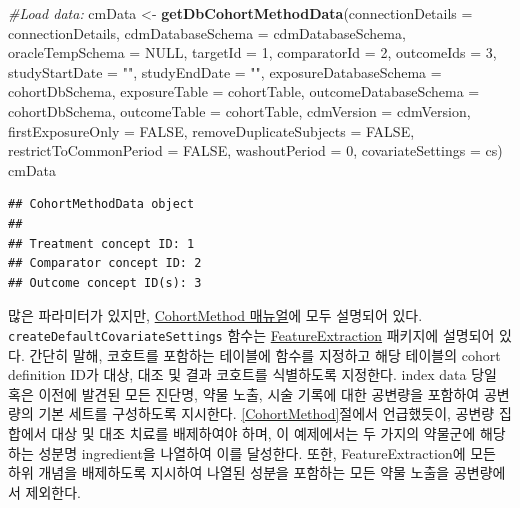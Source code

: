 \documentclass[11pt]{book}
\newenvironment{Shaded}{\begin{snugshade}}{\end{snugshade}}
\newcommand{\KeywordTok}[1]{\textcolor[rgb]{0.13,0.29,0.53}{\textbf{#1}}}
\newcommand{\DataTypeTok}[1]{\textcolor[rgb]{0.13,0.29,0.53}{#1}}
\newcommand{\DecValTok}[1]{\textcolor[rgb]{0.00,0.00,0.81}{#1}}
\newcommand{\StringTok}[1]{\textcolor[rgb]{0.31,0.60,0.02}{#1}}
\newcommand{\CommentTok}[1]{\textcolor[rgb]{0.56,0.35,0.01}{\textit{#1}}}
\newcommand{\OtherTok}[1]{\textcolor[rgb]{0.56,0.35,0.01}{#1}}
\newcommand{\NormalTok}[1]{#1}
\theoremstyle{definition}
\theoremstyle{definition}
\theoremstyle{definition}
\theoremstyle{remark}
\begin{document}
\begin{Shaded}
\begin{Highlighting}[]
\CommentTok{#Load data:}
\NormalTok{cmData <-}\StringTok{ }\KeywordTok{getDbCohortMethodData}\NormalTok{(}\DataTypeTok{connectionDetails =}\NormalTok{ connectionDetails,}
                                \DataTypeTok{cdmDatabaseSchema =}\NormalTok{ cdmDatabaseSchema,}
                                \DataTypeTok{oracleTempSchema =} \OtherTok{NULL}\NormalTok{,}
                                \DataTypeTok{targetId =} \DecValTok{1}\NormalTok{,}
                                \DataTypeTok{comparatorId =} \DecValTok{2}\NormalTok{,}
                                \DataTypeTok{outcomeIds =} \DecValTok{3}\NormalTok{,}
                                \DataTypeTok{studyStartDate =} \StringTok{""}\NormalTok{,}
                                \DataTypeTok{studyEndDate =} \StringTok{""}\NormalTok{,}
                                \DataTypeTok{exposureDatabaseSchema =}\NormalTok{ cohortDbSchema,}
                                \DataTypeTok{exposureTable =}\NormalTok{ cohortTable,}
                                \DataTypeTok{outcomeDatabaseSchema =}\NormalTok{ cohortDbSchema,}
                                \DataTypeTok{outcomeTable =}\NormalTok{ cohortTable,}
                                \DataTypeTok{cdmVersion =}\NormalTok{ cdmVersion,}
                                \DataTypeTok{firstExposureOnly =} \OtherTok{FALSE}\NormalTok{,}
                                \DataTypeTok{removeDuplicateSubjects =} \OtherTok{FALSE}\NormalTok{,}
                                \DataTypeTok{restrictToCommonPeriod =} \OtherTok{FALSE}\NormalTok{,}
                                \DataTypeTok{washoutPeriod =} \DecValTok{0}\NormalTok{,}
                                \DataTypeTok{covariateSettings =}\NormalTok{ cs)}
\NormalTok{cmData}
\end{Highlighting}
\end{Shaded}

\begin{verbatim}
## CohortMethodData object
## 
## Treatment concept ID: 1
## Comparator concept ID: 2
## Outcome concept ID(s): 3
\end{verbatim}

많은 파라미터가 있지만,
\href{https://ohdsi.github.io/CohortMethod/reference/}{CohortMethod
매뉴얼}에 모두 설명되어 있다. \texttt{createDefaultCovariateSettings}
함수는
\href{https://ohdsi.github.io/FeatureExtraction/}{FeatureExtraction}
패키지에 설명되어 있다. 간단히 말해, 코호트를 포함하는 테이블에 함수를
지정하고 해당 테이블의 cohort definition ID가 대상, 대조 및 결과
코호트를 식별하도록 지정한다. index data 당일 혹은 이전에 발견된 모든
진단명, 약물 노출, 시술 기록에 대한 공변량을 포함하여 공변량의 기본
세트를 구성하도록 지시한다. \ref{CohortMethod}절에서 언급했듯이, 공변량
집합에서 대상 및 대조 치료를 배제하여야 하며, 이 예제에서는 두 가지의
약물군에 해당하는 성분명 ingredient을 나열하여 이를 달성한다. 또한,
FeatureExtraction에 모든 하위 개념을 배제하도록 지시하여 나열된 성분을
포함하는 모든 약물 노출을 공변량에서 제외한다.
\end{document}
